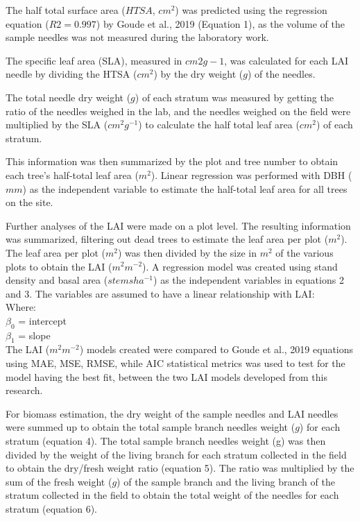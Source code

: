 \documentclass[11pt, a4paper]{report}
\begin{document}
The half total surface area ($HTSA$, $cm^2$) was predicted using the regression equation ($R2 = 0.997$) by Goude et al., 2019 (Equation 1), as the volume of the sample needles was not measured during the laboratory work. 

The specific leaf area (SLA), measured in $cm2g-1$, was calculated for each LAI needle by dividing the HTSA ($cm^2$) by the dry weight ($g$) of the needles. 

The total needle dry weight ($g$) of each stratum was measured by getting the ratio of the needles weighed in the lab, and the needles weighed on the field were multiplied by the SLA ($cm^2g^{-1}$) to calculate the half total leaf area ($cm^2$) of each stratum.

This information was then summarized by the plot and tree number to obtain each tree’s half-total leaf area ($m^2$). Linear regression was performed with DBH ($mm$) as the independent variable to estimate the half-total leaf area for all trees on the site.

Further analyses of the LAI were made on a plot level. The resulting information
was summarized, filtering out dead trees to estimate the leaf area per plot ($m^2$). The
leaf area per plot ($m^2$) was then divided by the size in $m^2$ of the various plots to
obtain the LAI ($m^2m^{-2}$).
A regression model was created using stand density and basal area ($stemsha^{-1}$) as
the independent variables in equations 2 and 3. The variables are assumed to have a linear relationship with LAI:\\
Where:\\
$\beta_0$ = intercept\\
$\beta_1$ = slope\\
The LAI ($m^2m^{-2}$) models created were compared to Goude et al., 2019 equations using MAE, MSE, RMSE, while AIC statistical metrics was used to test for the model having the best fit, between the two LAI models developed from this research. 

For biomass estimation, the dry weight of the sample needles and LAI needles were summed up to obtain the total sample branch needles weight ($g$) for each stratum (equation 4). The total sample branch needles weight (g) was then divided by the weight of the living branch for each stratum collected in the field to obtain the dry/fresh weight ratio (equation 5). The ratio was multiplied by the sum of the fresh weight ($g$) of the sample branch and the living branch of the stratum collected in the field to obtain the total weight of the needles for each stratum (equation 6). 
\end{document}
